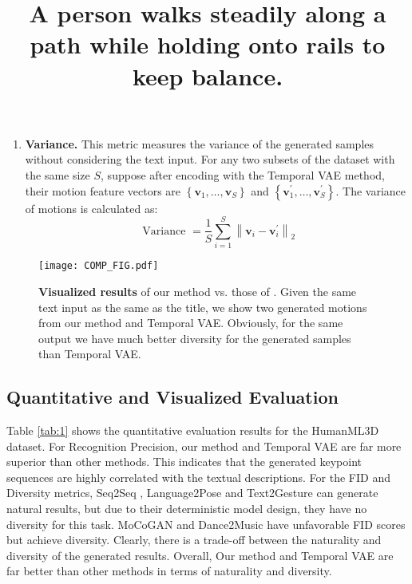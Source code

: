 \documentclass{article}
\begin{document}
\begin{enumerate}
\begin{table*}[ht!]
\begin{tabular}{|c c c c c c c|}
  \end{tabular}
  \caption{Quantitative evaluation results on the HumanML3D test set. R Precision(Top-$k$) is short for Recognition Precision with Top-$k$ accuracy. $\uparrow$ means the larger value the better performance; $\downarrow$ means the smaller value the better performance;$\rightarrow$ means the closer to Real motions the better performance.}
  \label{tab:1}
\end{table*}
  \item \textbf{Variance.} This metric measures the variance of the generated samples without considering the text input. For any two subsets of the dataset with the same size $S$, suppose after encoding with the Temporal VAE method, their motion feature vectors are $\left\{\mathbf{v}_{1}, \ldots, \mathbf{v}_{S}\right \}$ and $\left\{\mathbf{v}_{1}^{\prime}, \ldots, \mathbf{v}_{S}^{\prime}\right \}$. The variance of motions is calculated as:
  \begin{equation}
\text { Variance }=\frac{1}{S} \sum_{i=1}^{S}\left\|\mathbf{v}_{i}-\mathbf{v}_{i}^{\prime}\right\|_{2}
\end{equation}
\end{enumerate} 
\newpage



\begin{figure}[h]
    \centering
    \texttt{[image: COMP\_FIG.pdf]}
    \title{A person \textbf{walks steadily along a path} while\textbf{ holding onto rails} to keep balance.}
    \caption{\textbf{Visualized results} of our method vs. those of \cite{guo2022generating}. Given the same text input as the same as the title, we show two generated motions from our method and Temporal VAE. Obviously, for the same output we have much better diversity for the generated samples than Temporal VAE.}
    \label{fig:2}
    \vspace{-5mm}
\end{figure}





\subsection{Quantitative and Visualized Evaluation}

Table \ref{tab:1} shows the quantitative evaluation results for the HumanML3D dataset. For Recognition Precision, our method and Temporal VAE are far more superior than other methods. This indicates that the generated keypoint sequences are highly correlated with the textual descriptions. For the FID and Diversity metrics, Seq2Seq \cite{linvigil18}, Language2Pose \cite{ahuja2019language2pose} and Text2Gesture \cite{bhattacharya2021text2gestures} can generate natural results, but due to their deterministic model design, they have no diversity for this task. MoCoGAN \cite{tulyakov2018mocogan} and Dance2Music \cite{tang2018dance} have unfavorable FID scores but achieve diversity. Clearly, there is a trade-off between the naturality and diversity of the generated results. Overall, Our method and Temporal VAE are far better than other methods in terms of naturality and diversity.
\end{document}
